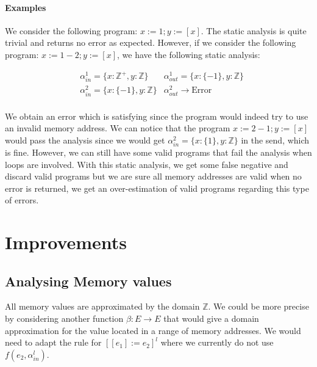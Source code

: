 \paragraph{Examples}

We consider the following program: $x:= 1; y:= [x]$.
The static analysis is quite trivial and returns no error as expected.
However, if we consider the following program: $x:= 1 - 2; y:= [x]$, we have the following static analysis:

\begin{align*}
	& \alpha_{in}^1 = \lbrace x: \mathbb{Z}^{+}, y: \mathbb{Z} \rbrace & \alpha_{out}^1 = \lbrace x: \lbrace -1 \rbrace, y: \mathbb{Z} \rbrace \\
	& \alpha_{in}^2 = \lbrace x: \lbrace -1 \rbrace, y: \mathbb{Z} \rbrace & \alpha_{out}^2 \longrightarrow \text{Error} \\
\end{align*}

We obtain an error which is satisfying since the program would indeed try to use an invalid memory address.
We can notice that the program $x:= 2 - 1; y:= [x]$ would pass the analysis since we would get $\alpha_{in}^2 = \lbrace x: \lbrace 1 \rbrace, y: \mathbb{Z} \rbrace$ in the send, which is fine.
However, we can still have some valid programs that fail the analysis when loops are involved.
With this static analysis, we get some false negative and discard valid programs but we are sure all memory addresses are valid when no error is returned, \ie{} we get an over-estimation of valid programs regarding this type of errors.
 

\section*{Improvements}

\subsection*{Analysing Memory values}
All memory values are approximated by the domain $\mathbb{Z}$.
We could be more precise by considering another function $\beta: E \longrightarrow E$ that would give a domain approximation for the value located in a range of memory addresses.
We would need to adapt the rule for $\left[[e_1] := e_2\right]^l$ where we currently do not use $f(e_2, \alpha_{in}^l)$.


